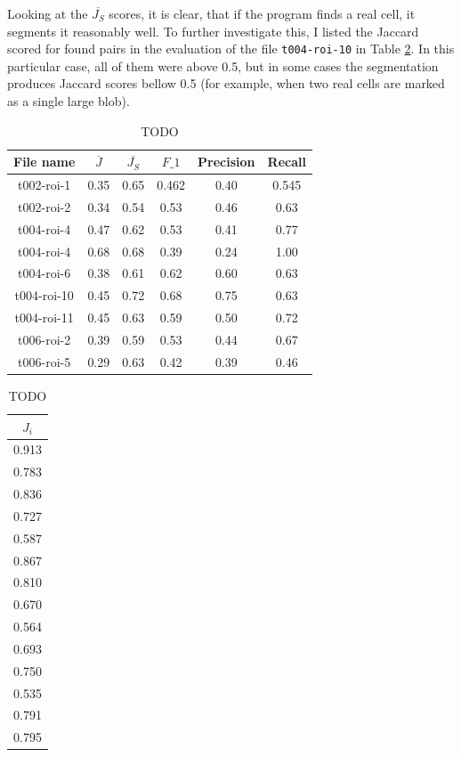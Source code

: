 \documentclass[
  digital,     %
  oneside,     %
  nosansbold,  %
  nocolorbold, %
  lof,         %
  lot,         %
]{fithesis4}
\begin{document}
Looking at the $\overline{J_S}$ scores, it is clear, that if the program finds a
real cell, it segments it reasonably well. To further investigate this, I listed
the Jaccard scored for found pairs in the evaluation of the file
\texttt{t004-roi-10} in Table \ref{tab:scores_roi10}. In this particular case,
all of them were above 0.5, but in some cases the segmentation produces Jaccard
scores bellow 0.5 (for example, when two real cells are marked as a single large
blob).

\begin{table}
    \begin{tabular}{|| c|c|c|c|c|c ||}
        \toprule
        File name & $\overline{J}$ & $\overline{J_S}$ & $F\_1$ & Precision & Recall \\
        \midrule
        t002-roi-1&0.35&0.65&0.462&0.40&0.545\\
        t002-roi-2&0.34&0.54&0.53&0.46&0.63\\
        t004-roi-4&0.47&0.62&0.53&0.41&0.77\\
        t004-roi-4&0.68&0.68&0.39&0.24&1.00\\
        t004-roi-6&0.38&0.61&0.62&0.60&0.63\\
        t004-roi-10&0.45&0.72&0.68&0.75&0.63\\
        t004-roi-11&0.45&0.63&0.59&0.50&0.72\\
        t006-roi-2&0.39&0.59&0.53&0.44&0.67\\
        t006-roi-5&0.29&0.63&0.42&0.39&0.46\\
        \bottomrule
    \end{tabular}
    \caption{TODO}
    \label{tab:scores}
\end{table}

\begin{table}
    \begin{tabular}{||c||}
        \toprule
        $J_i$\\
        \midrule
        0.913\\
        0.783\\
        0.836\\
        0.727\\
        0.587\\
        0.867\\
        0.810\\
        0.670\\
        0.564\\
        0.693\\
        0.750\\
        0.535\\
        0.791\\
        0.795\\
        \bottomrule
    \end{tabular}
    \caption{TODO}
    \label{tab:scores_roi10}
\end{table}
\end{document}
